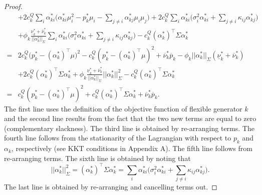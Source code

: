 \documentclass{article}
\begin{document}
\begin{proof}
\begin{align*}
    &+ 2c_k^Q \sum_i \alpha_{ki}^*\big(\alpha_{ki}^*\mu_i^2 - p_k^* \mu_i - \sum_{j \ne i} \alpha_{kj}^* \mu_i \mu_j)  + 2c_k^Q \sum_i \alpha_{ki}^* \big(\sigma_i^2 \alpha_{ki}^* + \sum_{j \ne i} \kappa_{ij} \alpha_{kj}^*\big)\\
    &+ \phi_k\frac{\underline{\nu}_k^* +\overline{\nu}_k^*}{||\alpha_k^*||_\Sigma} \sum_i \alpha_{ki}^*\big(\sigma_i^2 \alpha_{ki}^* + \sum_{j \ne i} \kappa_{ij} \alpha_{kj}^*\big) - c_k^Q (\alpha_k^*)^\top\Sigma \alpha_k^*\\
    =& 2c_k^Q\big(p_k^* - (\alpha_k^*)^\top \mu\big)^2 - c_k^Q(p_k^* - (\alpha_k^*)^\top \mu)^2 + \overline{\nu}_k^* \overline{p}_k - \phi_k||\alpha_k^*||_{\Sigma} (\underline{\nu}_k^* + \overline{\nu}_k^*)\\ 
    &+ 2c_k^Q (\alpha_{k}^*)^\top \Sigma \alpha_k^* + \phi_k\frac{\underline{\nu}_k^* +\overline{\nu}_k^*}{||\alpha_k^*||_\Sigma} ||\alpha_k^*||_\Sigma^2 - c_k^Q (\alpha_k^*)^\top\Sigma \alpha_k^*\\
    =& c_k^Q(p_k^* - (\alpha_k^*)^\top \mu)^2 + c_k^Q (\alpha_k^*)^\top \Sigma \alpha_k^* + \overline{\nu}_k^* \overline{p}_k.
\end{align*}
The first line uses the definition of the objective function of flexible generator $k$ and the second line results from the fact that the two new terms are equal to zero (complementary slackness). The third line is obtained by re-arranging terms. The fourth line follows from the stationarity of the Lagrangian with respect to $p_k$ and $\alpha_k$, respectively (see KKT conditions in Appendix A). The fifth line follows from re-arranging terms. The sixth line is obtained by noting that
\begin{equation*}
||\alpha_k^*||_\Sigma^2 = (\alpha_k^*)^\top \Sigma \alpha_k^* = \sum_i \alpha_{ki}^*\big(\sigma_i^2 \alpha_{ki}^* + \sum_{j \ne i} \kappa_{ij} \alpha_{kj}^*\big).
\end{equation*}
The last line is obtained by re-arranging and cancelling terms out.
\end{proof}
\end{document}
